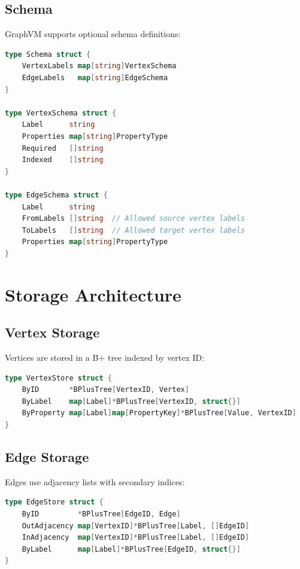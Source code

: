 \documentclass[11pt,a4paper]{article}
\theoremstyle{definition}
\begin{document}
\subsection{Schema}

GraphVM supports optional schema definitions:

\begin{lstlisting}[language=Go]
type Schema struct {
    VertexLabels map[string]VertexSchema
    EdgeLabels   map[string]EdgeSchema
}

type VertexSchema struct {
    Label      string
    Properties map[string]PropertyType
    Required   []string
    Indexed    []string
}

type EdgeSchema struct {
    Label      string
    FromLabels []string  // Allowed source vertex labels
    ToLabels   []string  // Allowed target vertex labels
    Properties map[string]PropertyType
}
\end{lstlisting}

\section{Storage Architecture}

\subsection{Vertex Storage}

Vertices are stored in a B+ tree indexed by vertex ID:

\begin{lstlisting}[language=Go]
type VertexStore struct {
    ByID       *BPlusTree[VertexID, Vertex]
    ByLabel    map[Label]*BPlusTree[VertexID, struct{}]
    ByProperty map[Label]map[PropertyKey]*BPlusTree[Value, VertexID]
}
\end{lstlisting}

\subsection{Edge Storage}

Edges use adjacency lists with secondary indices:

\begin{lstlisting}[language=Go]
type EdgeStore struct {
    ByID         *BPlusTree[EdgeID, Edge]
    OutAdjacency map[VertexID]*BPlusTree[Label, []EdgeID]
    InAdjacency  map[VertexID]*BPlusTree[Label, []EdgeID]
    ByLabel      map[Label]*BPlusTree[EdgeID, struct{}]
}
\end{lstlisting}
\end{document}
